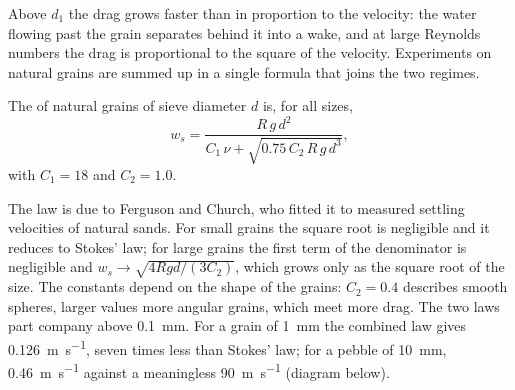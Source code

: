 Above $d_1$ the drag grows faster than in proportion to the velocity: the water
flowing past the grain separates behind it into a wake, and at large Reynolds
numbers the drag is proportional to the square of the velocity. Experiments on
natural grains are summed up in a single formula that joins the two regimes.

\begin{proposition}\label{prop:b1:erosion-transport:combined}
The  of natural grains of sieve diameter $d$ is, for all
sizes,
\[
  w_s = \frac{R\,g\,d^2}{C_1\,\nu + \sqrt{0.75\,C_2\,R\,g\,d^3}},
\]
with $C_1 = 18$ and $C_2 = 1.0$.
\end{proposition}
\admitted

The law is due to Ferguson and Church, who fitted it to measured settling
velocities of natural sands. For small grains the square root is
negligible and it reduces to Stokes' law; for large grains the first term of
the denominator is negligible and $w_s \to \sqrt{4 R g d/(3 C_2)}$, which grows
only as the square root of the size. The constants depend on the shape of the
grains: $C_2 = 0.4$ describes smooth spheres, larger values more angular
grains, which meet more drag. The two laws part company above
\qty{0.1}{mm}. For a grain of \qty{1}{mm} the combined law gives
\qty{0.126}{m.s^{-1}}, seven times less than Stokes' law; for a pebble of
\qty{10}{mm}, \qty{0.46}{m.s^{-1}} against a meaningless \qty{90}{m.s^{-1}}
(diagram below).

